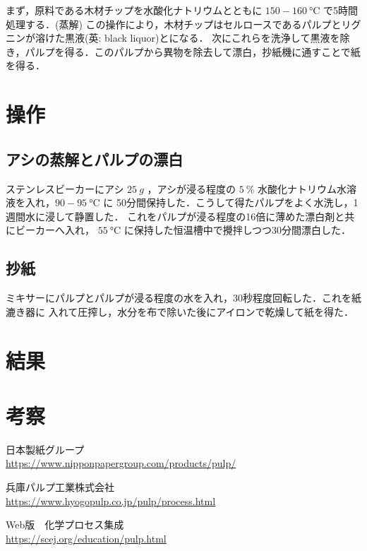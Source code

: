 \documentclass[uplatex, dvipdfmx, 10pt]{jarticle}
\begin{document}
            まず，原料である木材チップを水酸化ナトリウムとともに $150-\SI{160}{\celsius}$ で5時間処理する．(蒸解)
            この操作により，木材チップはセルロースであるパルプとリグニンが溶けた黒液(英: black liquor)とになる．
            次にこれらを洗浄して黒液を除き，パルプを得る．このパルプから異物を除去して漂白，抄紙機に通すことで紙を得る．

        \section*{操作}
           \subsection*{アシの蒸解とパルプの漂白}
                ステンレスビーカーにアシ $\SI{25}{g}$ ，アシが浸る程度の
                $\SI{5}{\%}$ 水酸化ナトリウム水溶液を入れ，$90-\SI{95}{\celsius}$ に
                50分間保持した．こうして得たパルプをよく水洗し，1週間水に浸して静置した．
                これをパルプが浸る程度の16倍に薄めた漂白剤と共にビーカーへ入れ，
                $\SI{55}{\celsius}$ に保持した恒温槽中で攪拌しつつ30分間漂白した．

            \subsection*{抄紙}
                ミキサーにパルプとパルプが浸る程度の水を入れ，30秒程度回転した．これを紙漉き器に
                入れて圧搾し，水分を布で除いた後にアイロンで乾燥して紙を得た．


        \section*{結果}


        \section*{考察}

            
        \begin{thebibliography}{9}
             日本製紙グループ 
                \\\url{https://www.nipponpapergroup.com/products/pulp/}

             兵庫パルプ工業株式会社 
                \\\url{https://www.hyogopulp.co.jp/pulp/process.html}
            
             Web版　化学プロセス集成 
                \\\url{https://scej.org/education/pulp.html}
        \end{thebibliography}
    
\end{document}
